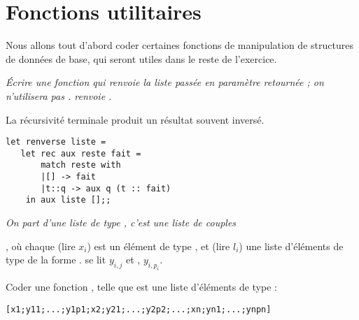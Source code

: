 \section{Fonctions utilitaires}
Nous allons tout d'abord coder certaines fonctions de manipulation de structures de données de base, qui seront utiles dans le reste de l'exercice.
\begin{Exercise}\it
Écrire une fonction  qui renvoie la liste passée en paramètre retournée ; on n'utilisera pas .  renvoie \type{[3; 2; 4]}.
\end{Exercise}
\begin{Answer}
La récursivité terminale produit un résultat souvent inversé.
\begin{lstlisting}
let renverse liste =
   let rec aux reste fait =
       match reste with
       |[] -> fait
       |t::q -> aux q (t :: fait)
    in aux liste [];;      
\end{lstlisting}
\end{Answer}
\begin{Exercise}\it
On part d'une liste  de type , c'est une liste de couples 

\type{[(x1, l1) ; ... ; (xn, ln)]}, où chaque  (lire $x_i$) est un élément de type , et  (lire $l_{i}$) une liste d'éléments de type  de la forme \type{[yi1 ; ... ;yipi]}.
 se lit $y_{i, j}$ et , $y_{i, p_i}$.

Coder une fonction , telle que  est une liste d'éléments de type  :
\begin{lstlisting}
[x1;y11;...;y1p1;x2;y21;...;y2p2;...;xn;yn1;...;ynpn]
\end{lstlisting}
\end{Exercise}

